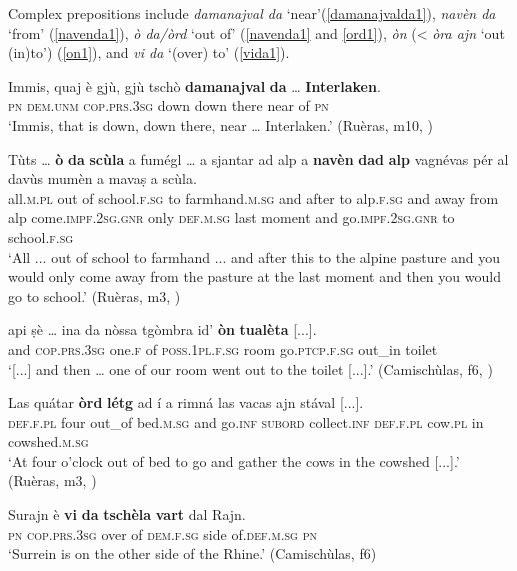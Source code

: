 Complex prepositions include \textit{damanajval da} `near'(\ref{damanajvalda1}), \textit{navèn da} `from' (\ref{navenda1}), \textit{ò da/òrd} `out of' (\ref{navenda1} and \ref{ord1}), \textit{òn} (< \textit{òra ajn} `out (in)to') (\ref{on1}), and \textit{vi da} `(over) to' (\ref{vida1}).

\ea
\label{damanajvalda1}
\gll  Immis, quaj è gjù, gjù tschò \textbf{damanajval} \textbf{da} … \textbf{Interlaken}.\\
\textsc{pn} \textsc{dem.unm} \textsc{cop.prs.3sg} down down there near of {} \textsc{pn} \\
\glt `Immis, that is down, down there, near … Interlaken.' (Ruèras, m10, )
\z

\ea
\label{navenda1}
\gll  Tùts … \textbf{ò} \textbf{da} \textbf{scùla} a fumégl … a sjantar ad alp a \textbf{navèn} \textbf{dad} \textbf{alp} vagnévas pér al davùs mumèn a mavaṣ a scùla. \\
all.\textsc{m.pl} {} out of school.\textsc{f.sg} to farmhand.\textsc{m.sg} {} and after to alp.\textsc{f.sg} and away from alp come.\textsc{impf.2sg.gnr} only \textsc{def.m.sg} last moment and go.\textsc{impf.2sg.gnr} to school.\textsc{f.sg}\\
\glt `All ... out of school to farmhand ... and after this to the alpine pasture and you would only come away from the pasture at the last moment and then you would go to school.' (Ruèras, m3, )
\z

\ea
\label{on1}
\gll    [...] api ṣè …  ina da nòssa tgòmbra id’ \textbf{òn} \textbf{tualèta} [...].\\
{} and \textsc{cop.prs.3sg} {} one.\textsc{f} of \textsc{poss.1pl.f.sg} room go.\textsc{ptcp.f.sg} out\_in toilet\\
\glt `[...] and then … one of our room went out to the toilet [...].' (Camischùlas, f6, )
\z

\ea
\label{ord1}
\gll Las quátar \textbf{òrd} \textbf{létg} ad í a rimná las vacas ajn stával [...].\\
\textsc{def.f.pl} four out\_of bed.\textsc{m.sg} and go.\textsc{inf} \textsc{subord} collect.\textsc{inf} \textsc{def.f.pl} cow.\textsc{pl} in cowshed.\textsc{m.sg}\\
\glt `At four o'clock out of bed to go and gather the cows in the cowshed [...].' (Ruèras, m3, )
\z

\ea
\label{vida1}
\gll Surajn è \textbf{vi} \textbf{da} \textbf{tschèla} \textbf{vart} dal Rajn.\\
\textsc{pn} \textsc{cop.prs.3sg} over of \textsc{dem.f.sg} side of.\textsc{def.m.sg} \textsc{pn} \\
\glt `Surrein is on the other side of the Rhine.' (Camischùlas, f6)
\z

